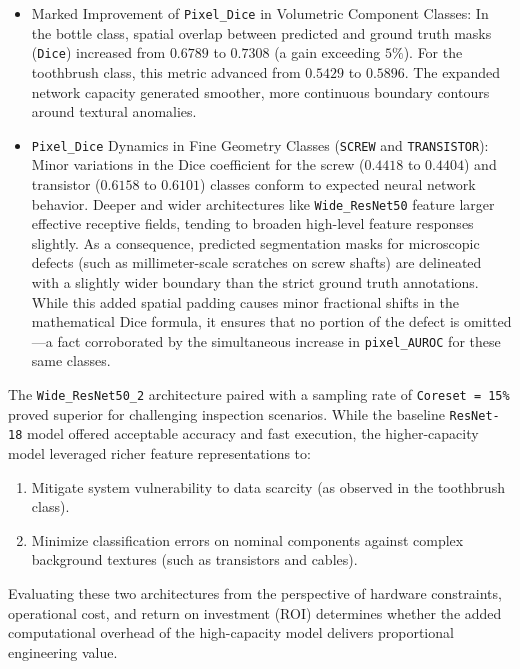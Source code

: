\documentclass{article}
\begin{document}
\begin{itemize}
\begin{itemize}
		\item Marked Improvement of \texttt{Pixel\_Dice} in Volumetric Component Classes: In the bottle class, spatial overlap between predicted and ground truth masks (\texttt{Dice}) increased from $0.6789$ to $0.7308$ (a gain exceeding $5\%$). For the toothbrush class, this metric advanced from $0.5429$ to $0.5896$. The expanded network capacity generated smoother, more continuous boundary contours around textural anomalies.
		
		\item \texttt{Pixel\_Dice} Dynamics in Fine Geometry Classes (\texttt{SCREW} and \texttt{TRANSISTOR}): Minor variations in the Dice coefficient for the screw ($0.4418$ to $0.4404$) and transistor ($0.6158$ to $0.6101$) classes conform to expected neural network behavior. Deeper and wider architectures like \texttt{Wide\_ResNet50} feature larger effective receptive fields, tending to broaden high-level feature responses slightly. As a consequence, predicted segmentation masks for microscopic defects (such as millimeter-scale scratches on screw shafts) are delineated with a slightly wider boundary than the strict ground truth annotations. While this added spatial padding causes minor fractional shifts in the mathematical Dice formula, it ensures that no portion of the defect is omitted—a fact corroborated by the simultaneous increase in \texttt{pixel\_AUROC} for these same classes.
	\end{itemize}
\end{itemize}

The \texttt{Wide\_ResNet50\_2} architecture paired with a sampling rate of \texttt{Coreset = 15\%} proved superior for challenging inspection scenarios. While the baseline \texttt{ResNet-18} model offered acceptable accuracy and fast execution, the higher-capacity model leveraged richer feature representations to:

\begin{enumerate}
	\item Mitigate system vulnerability to data scarcity (as observed in the toothbrush class).
	\item Minimize classification errors on nominal components against complex background textures (such as transistors and cables).
\end{enumerate}

Evaluating these two architectures from the perspective of hardware constraints, operational cost, and return on investment (ROI) determines whether the added computational overhead of the high-capacity model delivers proportional engineering value.
\end{document}
